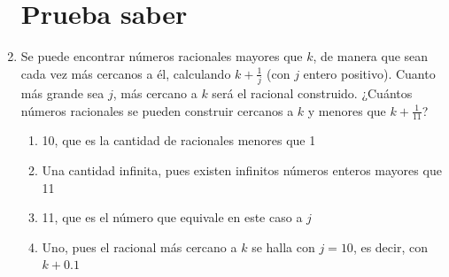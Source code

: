\documentclass[fleqn,twocolumn,landscape]{article}
\begin{document}
\begin{enumerate}
 \section*{Prueba saber}
 \item Se puede encontrar números racionales mayores que $k$, de manera que sean cada vez más cercanos a él, calculando $k +\frac{1}{j}$ (con $j$ entero positivo). Cuanto más grande sea $j$, más cercano a $k$ será el racional construido. ¿Cuántos números racionales se pueden construir cercanos a $k$ y menores que $k + \frac{1}{11}$?
\begin{enumerate}
\item 10, que es la cantidad de racionales menores que 1
\item Una cantidad infinita, pues existen infinitos números enteros mayores que 11
\item 11, que es el número que equivale en este caso a $j$
\item Uno, pues el racional más cercano a $k$ se halla con $j=10$, es decir, con $k+0.1$
\end{enumerate}
 \end{enumerate}
\end{document}
